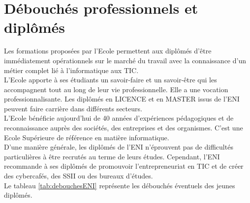 \documentclass[12pt]{report}
\begin{document}
				\section{Débouchés professionnels et diplômés}

				\hspace{15pt} Les formations proposées par l’Ecole permettent aux diplômés d’être immédiatement opérationnels sur le marché du travail avec la connaissance d’un métier complet lié à l’informatique aux TIC.\\

				L’Ecole apporte à ses étudiants un savoir-faire et un savoir-être qui les accompagnent tout au long de leur vie professionnelle. Elle a une vocation professionnalisante. Les diplômés en LICENCE et en MASTER issus de l’ENI peuvent faire carrière dans différents secteurs. \\

				L’Ecole bénéficie aujourd’hui de 40 années d’expériences pédagogiques et de reconnaissance auprès des sociétés, des entreprises et des organismes. C’est une Ecole Supérieure de référence en matière informatique.\\

				D’une manière générale, les diplômés de l’ENI n’éprouvent pas de difficultés particulières à être recrutés au terme de leurs études. Cependant, l’ENI recommande à ses diplômés de promouvoir l’entrepreneuriat en TIC et de créer des cybercafés, des SSII ou des bureaux d’études. \\

				Le tableau \ref{tab:debouchesENI} représente les débouchés éventuels des jeunes diplômés.
\end{document}
